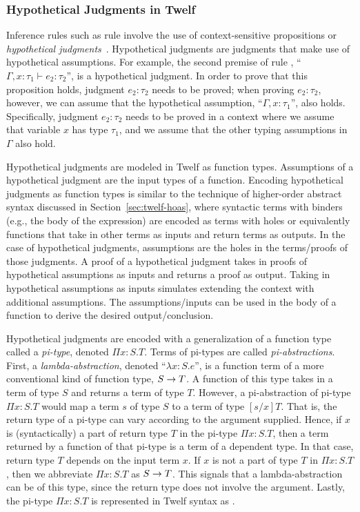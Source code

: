 \subsubsection{Hypothetical Judgments in Twelf}
Inference rules such as rule  involve the use of
context-sensitive propositions or \emph{hypothetical judgments}~\cite{TwelfHypothetical}.
Hypothetical judgments are judgments that make use of hypothetical assumptions.
For example, the second premise of rule ,
``\mbox{$\Gamma , x : \tau_1 \vdash e_2 : \tau_2$}'',
is a hypothetical judgment.
In order to prove that this proposition holds,
judgment $e_2 : \tau_2$ needs to be proved;
when proving $e_2 : \tau_2$, however, we can assume that
the hypothetical assumption, ``$\Gamma , x : \tau_1$'',
also holds.
Specifically, judgment $e_2 : \tau_2$ needs to be proved in a context
where we assume that variable $x$ has type $\tau_1$, and we assume that
the other typing assumptions in $\Gamma$ also hold.

Hypothetical judgments are modeled in Twelf as function types.
Assumptions of a hypothetical judgment are the input types of
a function.
Encoding hypothetical judgments as function types is similar to
the technique of higher-order abstract syntax discussed in
Section~\ref{sec:twelf-hoas}, where syntactic terms with binders
(e.g., the body of the  expression) are encoded as
terms with holes or equivalently
functions that take in other terms as inputs and return terms
as outputs.
In the case of hypothetical judgments, assumptions are the holes
in the terms/proofs of those judgments.
A proof of a hypothetical judgment takes in proofs of hypothetical
assumptions as inputs and returns a proof as output.
Taking in hypothetical assumptions as inputs simulates extending
the context with additional assumptions.
The assumptions/inputs can be used in the body of a function
to derive the desired output/conclusion.

Hypothetical judgments are encoded with a generalization of a
function type called a \emph{pi-type}, denoted $\Pi x:S.T$.
Terms of pi-types are called \emph{pi-abstractions}.
First, a \emph{lambda-abstraction}, denoted ``$\lambda x:S.e$'',
is a function term of a more conventional kind of function type,
 $S \rightarrow T$.
A function of this type takes in a term of type $S$ and
returns a term of type $T$.
However, a pi-abstraction of pi-type $\Pi x:S.T$ would map
a term $s$ of type $S$ to a term of type $[s / x]T$.
That is, the return type of a pi-type can vary according
to the argument supplied.
Hence, if $x$ is (syntactically) a part of return type $T$
in the pi-type $\Pi x:S.T$, then a term returned by a function
of that pi-type is a term of a dependent type.
In that case, return type $T$ depends on the input term $x$.
If $x$ is not a part of type $T$ in $\Pi x:S.T$,
then we abbreviate $\Pi x:S.T$ as $S \rightarrow T$.
This signals that a lambda-abstraction can be of
this type, since the return type does not involve the argument.
Lastly, the pi-type $\Pi x:S.T$ is represented in Twelf syntax
as .

